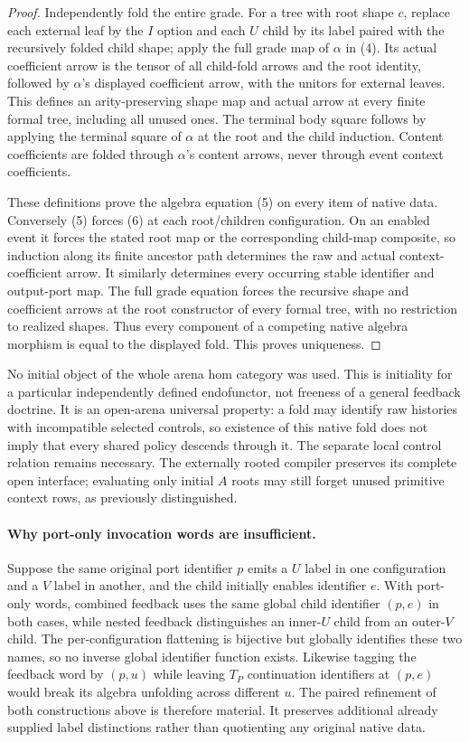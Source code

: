 \documentclass[11pt]{article}
\begin{document}
\begin{proof}
Independently fold the entire grade. For a tree with root shape $c$, replace each external leaf by the $I$ option and each $U$ child by its label paired with the recursively folded child shape; apply the full grade map of $\alpha$ in (4). Its actual coefficient arrow is the tensor of all child-fold arrows and the root identity, followed by $\alpha$'s displayed coefficient arrow, with the unitors for external leaves. This defines an arity-preserving shape map and actual arrow at every finite formal tree, including all unused ones. The terminal body square follows by applying the terminal square of $\alpha$ at the root and the child induction. Content coefficients are folded through $\alpha$'s content arrows, never through event context coefficients.

These definitions prove the algebra equation (5) on every item of native data. Conversely (5) forces (6) at each root/children configuration. On an enabled event it forces the stated root map or the corresponding child-map composite, so induction along its finite ancestor path determines the raw and actual context-coefficient arrow. It similarly determines every occurring stable identifier and output-port map. The full grade equation forces the recursive shape and coefficient arrows at the root constructor of every formal tree, with no restriction to realized shapes. Thus every component of a competing native algebra morphism is equal to the displayed fold. This proves uniqueness.
\end{proof}

No initial object of the whole arena hom category was used. This is initiality for a particular independently defined endofunctor, not freeness of a general feedback doctrine. It is an open-arena universal property: a fold may identify raw histories with incompatible selected controls, so existence of this native fold does not imply that every shared policy descends through it. The separate local control relation remains necessary. The externally rooted compiler preserves its complete open interface; evaluating only initial $A$ roots may still forget unused primitive context rows, as previously distinguished.

\paragraph{Why port-only invocation words are insufficient.}
Suppose the same original port identifier $p$ emits a $U$ label in one configuration and a $V$ label in another, and the child initially enables identifier $e$. With port-only words, combined feedback uses the same global child identifier $(p,e)$ in both cases, while nested feedback distinguishes an inner-$U$ child from an outer-$V$ child. The per-configuration flattening is bijective but globally identifies these two names, so no inverse global identifier function exists. Likewise tagging the feedback word by $(p,u)$ while leaving $T_P$ continuation identifiers at $(p,e)$ would break its algebra unfolding across different $u$. The paired refinement of both constructions above is therefore material. It preserves additional already supplied label distinctions rather than quotienting any original native data.
\end{document}
